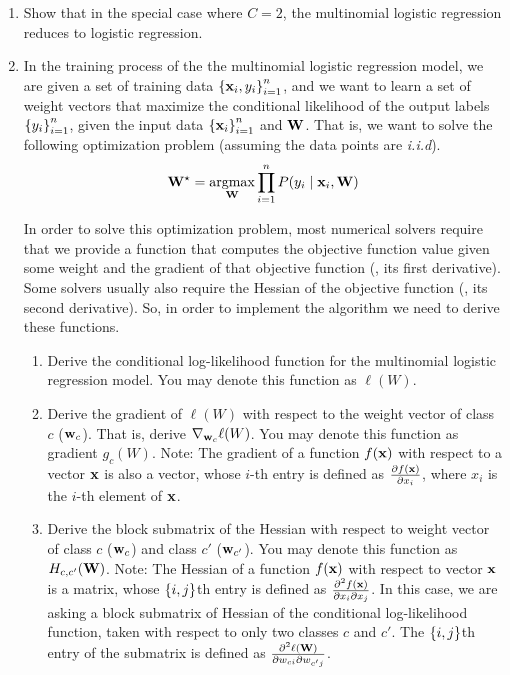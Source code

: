 \begin{enumerate}
\item Show that in the special case where $C = 2$, the multinomial logistic regression reduces to logistic regression.

\item In the training process of the the multinomial logistic regression model, we are given a set of training data $\left\lbrace \mathbf{x}_i, y_i \right\rbrace_{i=1}^n$, and we want to learn a set of weight vectors that maximize the conditional likelihood of the output labels $\left\lbrace y_i \right\rbrace_{i=1}^n$, given the input data $\left\lbrace \mathbf{x}_i \right\rbrace_{i=1}^n$ and $\mathbf{W}$. That is, we want to solve the following optimization problem (assuming the data points are \textit{i.i.d}).
\begin{align}
\mathbf{W}^\star = \operatorname*{argmax}_{\mathbf{W}} \prod_{i=1}^n P(y_i \mid \mathbf{x}_i, \mathbf{W})
\end{align}

In order to solve this optimization problem, most numerical solvers require that we provide a function that computes the objective function value given some weight and the gradient of that objective function (\ie, its first derivative). Some solvers usually also require the Hessian of the objective function (\ie, its second derivative). So, in order to implement the algorithm we need to derive these functions.

\begin{enumerate}
\item Derive the conditional log-likelihood function for the multinomial logistic regression model. You may denote this function as $\ell(W)$.

\item Derive the gradient of $\ell(W)$ with respect to the weight vector of class $c$ ($\mathbf{w}_c$). That is, derive $\nabla_{\mathbf{w}_c} \ell(W)$. You may denote this function as gradient $g_c(W)$. Note: The gradient of a function $f(\mathbf{x})$ with respect to a vector $\mathbf{x}$ is also a vector, whose $i$-th entry is defined as $\frac{\partial f(\mathbf{x})}{\partial x_i}$, where $x_i$ is the $i$-th element of $\mathbf{x}$.

\item Derive the block submatrix of the Hessian with respect to weight vector of class $c$ ($\mathbf{w}_c$) and class $c'$ ($\mathbf{w}_{c'}$). You may denote this function as $H_{c,c'}(\mathbf{W})$. Note: The Hessian of a function $f(\mathbf{x})$ with respect to vector $\mathbf{x}$ is a matrix, whose $\left\lbrace i, j \right\rbrace$th entry is defined as $ \frac{\partial^2 f(\mathbf{x})}{\partial x_i \partial x_j} $. In this case, we are asking a block submatrix of Hessian of the conditional log-likelihood function, taken with respect to only two classes $c$ and $c'$. The $\left\lbrace i, j \right\rbrace$th entry of the submatrix is defined as $ \frac{\partial^2 \ell(\mathbf{W})}{\partial w_{ci} \partial w_{c'j}} $.
\end{enumerate}

\end{enumerate}

